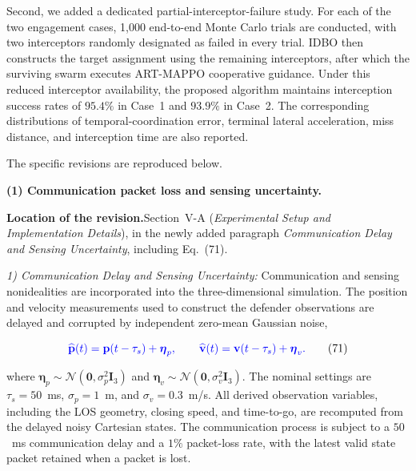 \documentclass[11pt]{article}
\newcommand{\hladd}[1]{{\color{addblue}#1}}
\newcommand{\loc}{\medskip\noindent\textbf{Location of the revision.}\quad}
\begin{document}
Second, we added a dedicated partial-interceptor-failure study. For each of
the two engagement cases, 1,000 end-to-end Monte Carlo trials are conducted,
with two interceptors randomly designated as failed in every trial. IDBO then
constructs the target assignment using the remaining interceptors, after
which the surviving swarm executes ART-MAPPO cooperative guidance. Under
this reduced interceptor availability, the proposed algorithm maintains
interception success rates of $95.4\%$ in Case~1 and $93.9\%$ in Case~2.
The corresponding distributions of temporal-coordination error, terminal
lateral acceleration, miss distance, and interception time are also reported.

The specific revisions are reproduced below.

\medskip
\noindent\textbf{(1) Communication packet loss and sensing uncertainty.}

\loc Section~V-A (\emph{Experimental Setup and Implementation Details}), in
the newly added paragraph \emph{Communication Delay and Sensing
Uncertainty}, including Eq.~(71).

\begin{tcolorbox}[enhanced,breakable,colback=white,colframe=addblue!55,
boxrule=0.6pt,arc=2pt,left=9pt,right=9pt,top=7pt,bottom=7pt]
\hladd{\emph{1) Communication Delay and Sensing Uncertainty:}
Communication and sensing nonidealities are incorporated into the
three-dimensional simulation. The position and velocity measurements used to
construct the defender observations are delayed and corrupted by independent
zero-mean Gaussian noise,}

\begin{equation*}
{\color{blue}
\widehat{\mathbf{p}}(t)
=
\mathbf{p}(t-\tau_s)+\boldsymbol{\eta}_p,
\qquad
\widehat{\mathbf{v}}(t)
=
\mathbf{v}(t-\tau_s)+\boldsymbol{\eta}_v.}
\tag{71}
\end{equation*}

\hladd{where
$\boldsymbol{\eta}_p\sim\mathcal{N}(\mathbf{0},\sigma_p^2\mathbf{I}_3)$
and
$\boldsymbol{\eta}_v\sim\mathcal{N}(\mathbf{0},\sigma_v^2\mathbf{I}_3)$.
The nominal settings are
$\tau_s=50$~ms,
$\sigma_p=1$~m, and
$\sigma_v=0.3$~m/s.
All derived observation variables, including the LOS geometry, closing speed,
and time-to-go, are recomputed from the delayed noisy Cartesian states.
The communication process is subject to a $50$~ms communication delay and 
a $1\%$ packet-loss rate, with the latest valid state packet retained 
when a packet is lost.}
\end{tcolorbox}
\end{document}
